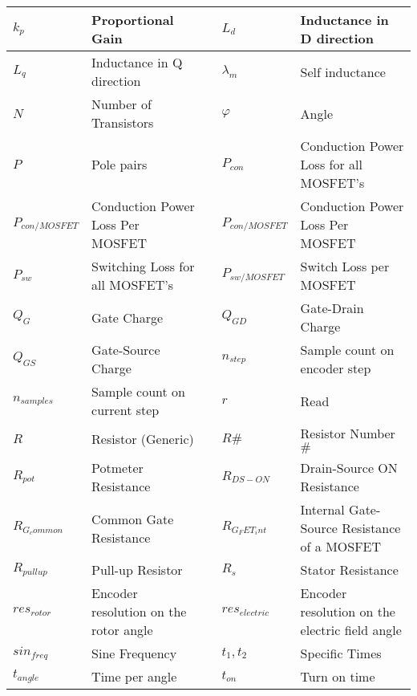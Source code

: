 \begin{table}[H]
\begin{tabular}{|p{2cm}|p{4.5cm}|l|p{2cm}|p{4.5cm}|}
$k_p$                & Proportional Gain                &&  $L_d$                & Inductance in D direction        \\ \hline
$L_q$                & Inductance in Q direction        &&  $\lambda _m$         & Self inductance                  \\ \hline
$N$                  & Number of Transistors            &&  $\varphi$            & Angle                            \\ \hline
$P$                  & Pole pairs                       &&  $P_{con}$            & Conduction Power Loss for all MOSFET's \\ \hline
$P_{con/ MOSFET}$    & Conduction Power Loss Per MOSFET &&  $P_{con/ MOSFET}$    & Conduction Power Loss Per MOSFET \\ \hline
$P_{sw}$             & Switching Loss for all MOSFET's  &&  $P_{sw/MOSFET}$      & Switch Loss per MOSFET           \\ \hline
$Q_{G}$              & Gate Charge                      &&  $Q_{GD}$             & Gate-Drain Charge                \\ \hline
$Q_{GS}$             & Gate-Source Charge               &&  $n_{step}$           & Sample count on encoder step     \\ \hline
$n_{samples}$        & Sample count on current step     &&  $r$                  & Read                             \\ \hline
$R$                  & Resistor (Generic)               && $R\#$                 & Resistor Number $\#$             \\ \hline
$R_{pot}$            & Potmeter Resistance              &&  $R_{DS-ON}$          & Drain-Source ON Resistance       \\ \hline
$R_{G_common}$       & Common Gate Resistance           &&  $R_{G_FET_int}$      & Internal Gate-Source Resistance of a MOSFET \\ \hline
$R_{pullup}$         & Pull-up Resistor                 &&  $R_s$                & Stator Resistance                \\ \hline
$res_{rotor}$        & Encoder resolution on the rotor angle &&  $res_{electric}$& Encoder resolution on the electric field angle \\ \hline
$sin_{freq}$         & Sine Frequency                   &&  $t_1, t_2$           & Specific Times                   \\ \hline
$t_{angle}$          & Time per angle                   &&  $t_{on}$             & Turn on time                     \\ \hline

\end{tabular}
\end{table}
